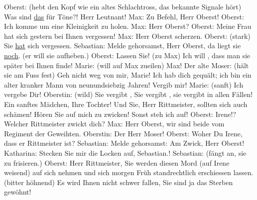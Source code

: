 \begin{ledgroupsized}[t]{13cm}
           \pstart
           Oberst: (hebt den Kopf wie ein altes Schlachtross, das bekannte Signale hört) Was
               sind \uline{das} für Töne?! Herr Leutnant!\pend
           \pstart
           Max: Zu Befehl, Herr Oberst!\pend
           \pstart
           Oberst: Ich komme um eine Kleinigkeit zu holen.\pend
           \pstart
           Max: Herr Oberst?\pend
           \pstart
           {\pb}Oberst: Meine Frau hat sich
               gestern bei Ihnen vergessen!\pend
           \pstart
           Max: Herr Oberst scherzen.\pend
           \pstart
           Oberst: (stark) Sie 
               \uline{hat}
                sich vergessen.\pend
           \pstart
           Sebastian: Melde gehorsamst, Herr Oberst, da liegt sie \uline{noch}. (er will sie aufheben.)\pend
           \pstart
           Oberst: Lassen Sie! (zu Max) Ich will , dass man
               sie später bei Ihnen finde!\pend
           \pstart
           Marie: (will auf Max zueilen) Max!\pend
           \pstart
           Der alte Moser: (hält sie am Fuss fest) Geh nicht weg von mir, Marie! Ich hab dich
               gequält; ich bin ein alter kranker Mann von neunundsiebzig Jahren! Vergib mir!\pend
           \pstart
           Marie: (sanft) Ich vergebe Dir!\pend
           \pstart
           Oberstin: (wild) Sie vergibt , Sie vergibt , sie vergibt in allen Fällen! Ein sanftes Mädchen, Ihre
               Tochter! Und Sie, Herr Rittmeister, sollten sich auch schämen! Hören Sie auf mich zu
               zwicken! Sonst steh ich auf!\pend
           \pstart
           Oberst: Irene!? Welcher Rittmeister zwickt dich?\pend
           \pstart
           Max: Herr Oberst, wir sind beide vom Regiment der Geweihten.\pend
           \pstart
           Oberstin: Der Herr Moser!\pend
           \pstart
           Oberst: Woher \label{T_L01900_1v}\label{T_L01900_1h} Du Irene, dass er Rittmeister ist?\pend
           \pstart
           Sebastian: Melde gehorsamst: Am Zwick, Herr Oberst!\pend
           \pstart
           Katharina: Stecken Sie mir die Locken auf, Sebastian.!\pend
           \pstart
           Sebastian: (fängt an, sie zu frisieren.)\pend
           \pstart
           Oberst: Herr Rittmeister, Sie werden diesen Mord (auf Irene weisend) auf sich nehmen
               und sich morgen Früh standrechtlich erschiessen lassen. (bitter höhnend) Es wird
               Ihnen nicht schwer fallen, Sie sind ja das Sterben gewöhnt!\pend

\end{ledgroupsized}
